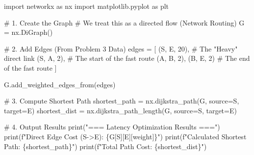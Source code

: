 \documentclass[
  letterpaper,
  DIV=11,
  numbers=noendperiod]{scrreprt}
\newenvironment{Shaded}{\begin{snugshade}}{\end{snugshade}}
\newcommand{\BuiltInTok}[1]{\textcolor[rgb]{0.00,0.23,0.31}{#1}}
\newcommand{\CommentTok}[1]{\textcolor[rgb]{0.37,0.37,0.37}{#1}}
\newcommand{\DecValTok}[1]{\textcolor[rgb]{0.68,0.00,0.00}{#1}}
\newcommand{\ImportTok}[1]{\textcolor[rgb]{0.00,0.46,0.62}{#1}}
\newcommand{\NormalTok}[1]{\textcolor[rgb]{0.00,0.23,0.31}{#1}}
\newcommand{\OperatorTok}[1]{\textcolor[rgb]{0.37,0.37,0.37}{#1}}
\newcommand{\SpecialCharTok}[1]{\textcolor[rgb]{0.37,0.37,0.37}{#1}}
\newcommand{\SpecialStringTok}[1]{\textcolor[rgb]{0.13,0.47,0.30}{#1}}
\newcommand{\StringTok}[1]{\textcolor[rgb]{0.13,0.47,0.30}{#1}}
\begin{document}
\begin{Shaded}
\begin{Highlighting}[]
\ImportTok{import}\NormalTok{ networkx }\ImportTok{as}\NormalTok{ nx}
\ImportTok{import}\NormalTok{ matplotlib.pyplot }\ImportTok{as}\NormalTok{ plt}

\CommentTok{\# 1. Create the Graph}
\CommentTok{\# We treat this as a directed flow (Network Routing)}
\NormalTok{G }\OperatorTok{=}\NormalTok{ nx.DiGraph()}

\CommentTok{\# 2. Add Edges (From Problem 3 Data)}
\NormalTok{edges }\OperatorTok{=}\NormalTok{ [}
\NormalTok{    (}\StringTok{\textquotesingle{}S\textquotesingle{}}\NormalTok{, }\StringTok{\textquotesingle{}E\textquotesingle{}}\NormalTok{, }\DecValTok{20}\NormalTok{), }\CommentTok{\# The "Heavy" direct link}
\NormalTok{    (}\StringTok{\textquotesingle{}S\textquotesingle{}}\NormalTok{, }\StringTok{\textquotesingle{}A\textquotesingle{}}\NormalTok{, }\DecValTok{2}\NormalTok{),  }\CommentTok{\# The start of the fast route}
\NormalTok{    (}\StringTok{\textquotesingle{}A\textquotesingle{}}\NormalTok{, }\StringTok{\textquotesingle{}B\textquotesingle{}}\NormalTok{, }\DecValTok{2}\NormalTok{),}
\NormalTok{    (}\StringTok{\textquotesingle{}B\textquotesingle{}}\NormalTok{, }\StringTok{\textquotesingle{}E\textquotesingle{}}\NormalTok{, }\DecValTok{2}\NormalTok{)   }\CommentTok{\# The end of the fast route}
\NormalTok{]}

\NormalTok{G.add\_weighted\_edges\_from(edges)}

\CommentTok{\# 3. Compute Shortest Path}
\NormalTok{shortest\_path }\OperatorTok{=}\NormalTok{ nx.dijkstra\_path(G, source}\OperatorTok{=}\StringTok{\textquotesingle{}S\textquotesingle{}}\NormalTok{, target}\OperatorTok{=}\StringTok{\textquotesingle{}E\textquotesingle{}}\NormalTok{)}
\NormalTok{shortest\_dist }\OperatorTok{=}\NormalTok{ nx.dijkstra\_path\_length(G, source}\OperatorTok{=}\StringTok{\textquotesingle{}S\textquotesingle{}}\NormalTok{, target}\OperatorTok{=}\StringTok{\textquotesingle{}E\textquotesingle{}}\NormalTok{)}

\CommentTok{\# 4. Output Results}
\BuiltInTok{print}\NormalTok{(}\StringTok{"=== Latency Optimization Results ==="}\NormalTok{)}
\BuiltInTok{print}\NormalTok{(}\SpecialStringTok{f"Direct Edge Cost (S{-}\textgreater{}E): }\SpecialCharTok{\{}\NormalTok{G[}\StringTok{\textquotesingle{}S\textquotesingle{}}\NormalTok{][}\StringTok{\textquotesingle{}E\textquotesingle{}}\NormalTok{][}\StringTok{\textquotesingle{}weight\textquotesingle{}}\NormalTok{]}\SpecialCharTok{\}}\SpecialStringTok{"}\NormalTok{)}
\BuiltInTok{print}\NormalTok{(}\SpecialStringTok{f"Calculated Shortest Path: }\SpecialCharTok{\{}\NormalTok{shortest\_path}\SpecialCharTok{\}}\SpecialStringTok{"}\NormalTok{)}
\BuiltInTok{print}\NormalTok{(}\SpecialStringTok{f"Total Path Cost: }\SpecialCharTok{\{}\NormalTok{shortest\_dist}\SpecialCharTok{\}}\SpecialStringTok{"}\NormalTok{)}


\end{Highlighting}
\end{Shaded}
\end{document}
